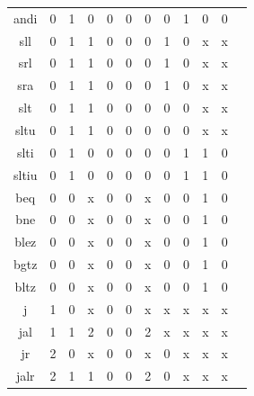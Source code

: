 \documentclass[a4paper]{article}  %
\begin{document}
\begin{table}[H]
\begin{tabular}{cccccccccccc}
        andi    & 0 & 1 & 0 & 0 & 0 & 0 & 0 & 1 & 0 & 0 \\
        sll     & 0 & 1 & 1 & 0 & 0 & 0 & 1 & 0 & x & x \\
        srl     & 0 & 1 & 1 & 0 & 0 & 0 & 1 & 0 & x & x \\
        sra     & 0 & 1 & 1 & 0 & 0 & 0 & 1 & 0 & x & x \\
        slt     & 0 & 1 & 1 & 0 & 0 & 0 & 0 & 0 & x & x \\
        sltu    & 0 & 1 & 1 & 0 & 0 & 0 & 0 & 0 & x & x \\
        slti    & 0 & 1 & 0 & 0 & 0 & 0 & 0 & 1 & 1 & 0 \\
        sltiu   & 0 & 1 & 0 & 0 & 0 & 0 & 0 & 1 & 1 & 0 \\
        beq     & 0 & 0 & x & 0 & 0 & x & 0 & 0 & 1 & 0 \\
        bne     & 0 & 0 & x & 0 & 0 & x & 0 & 0 & 1 & 0 \\
        blez    & 0 & 0 & x & 0 & 0 & x & 0 & 0 & 1 & 0 \\
        bgtz    & 0 & 0 & x & 0 & 0 & x & 0 & 0 & 1 & 0 \\
        bltz    & 0 & 0 & x & 0 & 0 & x & 0 & 0 & 1 & 0 \\
        j       & 1 & 0 & x & 0 & 0 & x & x & x & x & x \\
        jal     & 1 & 1 & 2 & 0 & 0 & 2 & x & x & x & x \\
        jr      & 2 & 0 & x & 0 & 0 & x & 0 & x & x & x \\
        jalr    & 2 & 1 & 1 & 0 & 0 & 2 & 0 & x & x & x \\
        \bottomrule
    \end{tabular}
\end{table}
\end{document}
